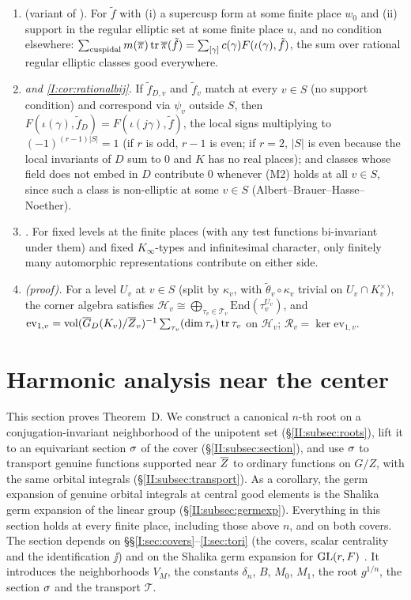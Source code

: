 \begin{enumerate}[label=(I\arabic*)]
\item \emph{} (variant of \cite[\S18]{FK86}). For $\tilde f$ with (i) a supercusp form at some finite place $w_0$ and (ii) support in the regular elliptic set at some finite place $u$, and no condition elsewhere: $\sum_{\text{cuspidal}}m(\overline{\pi})\operatorname{tr}\overline{\pi}(\tilde f)=\sum_{[\gamma]}c(\gamma)F(\iota(\gamma),\tilde f)$, the sum over rational regular elliptic classes good everywhere.
\item \emph{ and \cref{I:cor:rationalbij}.} If $\tilde f_{D,v}$ and $\tilde f_v$ match at every $v\in S$ (no support condition) and correspond via $\psi_v$ outside $S$, then $F(\iota(\gamma),\tilde f_D)=F(\iota(j\gamma),\tilde f)$, the local signs multiplying to $(-1)^{(r-1)|S|}=1$ (if $r$ is odd, $r-1$ is even; if $r=2$, $|S|$ is even because the local invariants of $D$ sum to $0$ and $K$ has no real places); and classes whose field does not embed in $D$ contribute $0$ whenever (M2) holds at all $v\in S$, since such a class is non-elliptic at some $v\in S$ (Albert--Brauer--Hasse--Noether).
\item \emph{.} For fixed levels at the finite places (with any test functions bi-invariant under them) and fixed $K_\infty$-types and infinitesimal character, only finitely many automorphic representations contribute on either side.
\item \emph{ (proof).} For a level $U_v$ at $v\in S$ (split by $\kappa_v$, with $\tilde\theta_v\circ\kappa_v$ trivial on $U_v\cap K_v^\times$), the corner algebra satisfies $\mathcal H_v\cong\bigoplus_{\tau_v\in\mathcal T_v}\mathrm{End}(\tau_v^{U_v})$, and $\mathrm{ev}_{1,v}=\operatorname{vol}(\overline{G}_D(K_v)/\overline{Z}_v)^{-1}\sum_{\tau_v}(\dim\tau_v)\operatorname{tr}\tau_v$ on $\mathcal H_v$; $\mathcal R_v=\ker\mathrm{ev}_{1,v}$.
\end{enumerate}

\section{Harmonic analysis near the center}\label{II:sec:center}
This section proves Theorem~D. We construct a canonical $n$-th root on a conjugation-invariant neighborhood of the unipotent set (\S\ref{II:subsec:roots}), lift it to an equivariant section $\sigma$ of the cover (\S\ref{II:subsec:section}), and use $\sigma$ to transport genuine functions supported near $\overline{Z}$ to ordinary functions on $G/Z$, with the same orbital integrals (\S\ref{II:subsec:transport}). As a corollary, the germ expansion of genuine orbital integrals at central good elements is the Shalika germ expansion of the linear group (\S\ref{II:subsec:germexp}). Everything in this section holds at every finite place, including those above $n$, and on both covers. The section depends on \S\S\ref{I:sec:covers}--\ref{I:sec:tori} (the covers, scalar centrality and the identification $\jj$) and on the Shalika germ expansion for $\mathrm{GL}(r,F)$ \cite{Sha72}. It introduces the neighborhoods $V_M$, the constants $\delta_n$, $B$, $M_0$, $M_1$, the root $g^{1/n}$, the section $\sigma$ and the transport $\mathcal T$.

